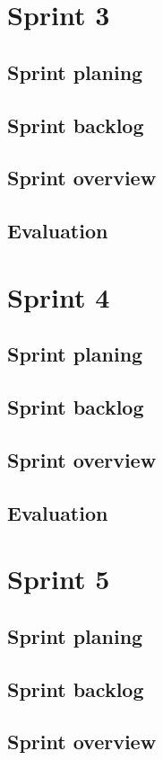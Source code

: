 \documentclass[11pt,a4paper,titlepage,oneside]{report}
\begin{document}
\chapter{Sprint 3}
\section{Sprint planing}
\section{Sprint backlog}
\section{Sprint overview}
\section{Evaluation}

\chapter{Sprint 4}
\section{Sprint planing}
\section{Sprint backlog}
\section{Sprint overview}
\section{Evaluation}

\chapter{Sprint 5}
\section{Sprint planing}
\section{Sprint backlog}
\section{Sprint overview}
\end{document}
